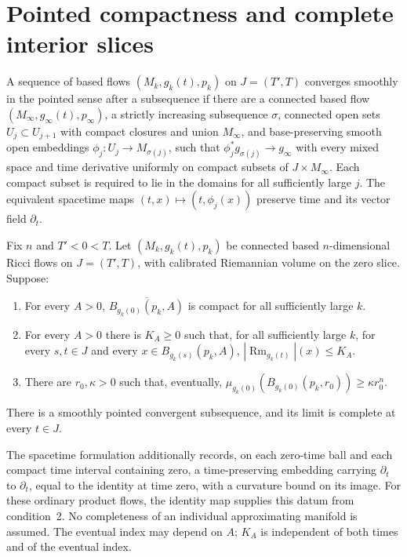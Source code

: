 \section{Pointed compactness and complete interior slices}
\label{sec:rf-compactness}

\begin{definition}\label{def:rf-pointed-convergence}
A sequence of based flows $(M_k,g_k(t),p_k)$ on $J=(T',T)$ converges
smoothly in the pointed sense after a subsequence if there are a
connected based flow $(M_\infty,g_\infty(t),p_\infty)$, a strictly
increasing subsequence $\sigma$, connected open sets
$U_j\subset U_{j+1}$ with compact closures and union $M_\infty$,
and base-preserving smooth open embeddings
$\phi_j:U_j\to M_{\sigma(j)}$, such that
$\phi_j^*g_{\sigma(j)}\to g_\infty$ with every mixed space and time
derivative uniformly on compact subsets of $J\times M_\infty$.
Each compact subset is required to lie in the domains for all
sufficiently large $j$.  The equivalent spacetime maps
$(t,x)\mapsto(t,\phi_j(x))$ preserve time and its vector field
$\partial_t$.
\end{definition}

\begin{theorem}\label{thm:rf-compactness}
Fix $n$ and $T'<0<T$.  Let $(M_k,g_k(t),p_k)$ be connected based
$n$-dimensional Ricci flows on $J=(T',T)$, with calibrated Riemannian
volume on the zero slice.  Suppose:
\begin{enumerate}
 \item For every $A>0$, $\overline{B_{g_k(0)}(p_k,A)}$ is compact
 for all sufficiently large $k$.
 \item For every $A>0$ there is $K_A\geq0$ such that, for all
 sufficiently large $k$, for every $s,t\in J$ and every
 $x\in B_{g_k(s)}(p_k,A)$,
 $|\operatorname{Rm}_{g_k(t)}|(x)\leq K_A$.
 \item There are $r_0,\kappa>0$ such that, eventually,
 $\mu_{g_k(0)}(B_{g_k(0)}(p_k,r_0))\geq\kappa r_0^n$.
\end{enumerate}
There is a smoothly pointed convergent subsequence, and its limit is
complete at every $t\in J$.
\end{theorem}

The spacetime formulation additionally records, on each zero-time ball
and each compact time interval containing zero, a time-preserving
embedding carrying $\partial_t$ to $\partial_t$, equal to the identity
at time zero, with a curvature bound on its image.  For these ordinary
product flows, the identity map supplies this datum from condition~2.
No completeness of an individual approximating manifold is assumed.
The eventual index may depend on $A$; $K_A$ is independent of both
times and of the eventual index.

